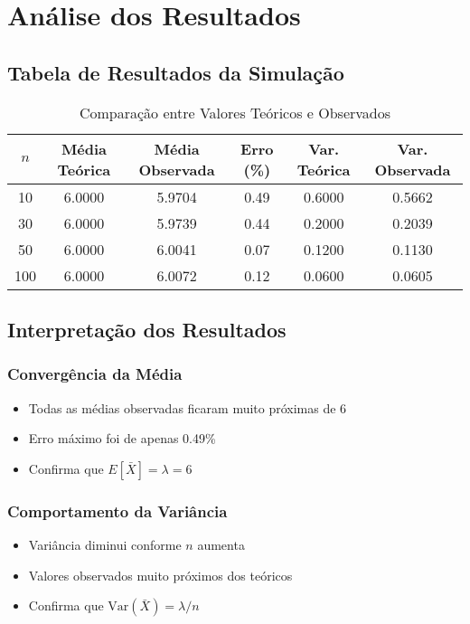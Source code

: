 \documentclass[12pt,a4paper]{article}
\begin{document}
\section{Análise dos Resultados}

\subsection{Tabela de Resultados da Simulação}

\begin{table}[H]
\centering
\caption{Comparação entre Valores Teóricos e Observados}
\begin{tabular}{@{}cccccc@{}}
\toprule
\textbf{$n$} & \textbf{Média Teórica} & \textbf{Média Observada} & \textbf{Erro (\%)} & \textbf{Var. Teórica} & \textbf{Var. Observada} \\
\midrule
10  & 6.0000 & 5.9704 & 0.49 & 0.6000 & 0.5662 \\
30  & 6.0000 & 5.9739 & 0.44 & 0.2000 & 0.2039 \\
50  & 6.0000 & 6.0041 & 0.07 & 0.1200 & 0.1130 \\
100 & 6.0000 & 6.0072 & 0.12 & 0.0600 & 0.0605 \\
\bottomrule
\end{tabular}
\end{table}

\subsection{Interpretação dos Resultados}

\subsubsection{Convergência da Média}
\begin{itemize}
    \item Todas as médias observadas ficaram muito próximas de 6
    \item Erro máximo foi de apenas 0.49\%
    \item Confirma que $E[\bar{X}] = \lambda = 6$
\end{itemize}

\subsubsection{Comportamento da Variância}
\begin{itemize}
    \item Variância diminui conforme $n$ aumenta
    \item Valores observados muito próximos dos teóricos
    \item Confirma que $\text{Var}(\bar{X}) = \lambda/n$
\end{itemize}
\end{document}
